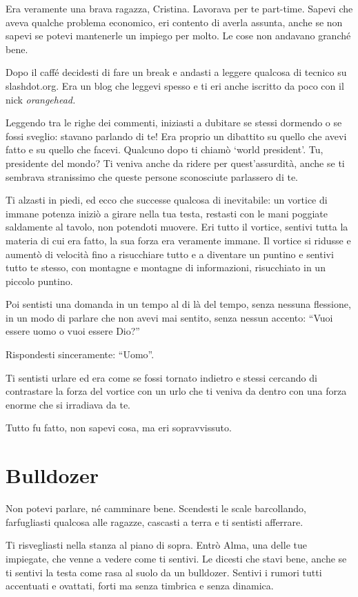 Era veramente una brava ragazza, Cristina. Lavorava per te part-time. Sapevi che aveva qualche problema economico, eri contento di averla assunta, anche se non sapevi se potevi mantenerle un impiego per molto. Le cose non andavano granché bene.

Dopo il caffé decidesti di fare un break e andasti a leggere qualcosa di tecnico su slashdot.org. Era un blog che leggevi spesso e ti eri anche iscritto da poco con il nick \textit{orangehead.}

Leggendo tra le righe dei commenti, iniziasti a dubitare se stessi dormendo o se fossi sveglio: stavano parlando di te! Era proprio un dibattito su quello che avevi fatto e su quello che facevi. Qualcuno dopo ti chiamò `world president'. Tu, presidente del mondo? Ti veniva anche da ridere per quest'assurdità, anche se ti sembrava stranissimo che queste persone sconosciute parlassero di te.

Ti alzasti in piedi, ed ecco che successe qualcosa di inevitabile: un vortice di immane potenza iniziò a girare nella tua testa, restasti con le mani poggiate saldamente al tavolo, non potendoti muovere. Eri tutto il vortice, sentivi tutta la materia di cui era fatto, la sua forza era veramente immane. Il vortice si ridusse e aumentò di velocità fino a risucchiare tutto e a diventare un puntino e sentivi tutto te stesso, con montagne e montagne di informazioni, risucchiato in un piccolo puntino.

Poi sentisti una domanda in un tempo al di là del tempo, senza nessuna flessione, in un modo di parlare che non avevi mai sentito, senza nessun accento: “Vuoi essere uomo o vuoi essere Dio?”

Rispondesti sinceramente: “Uomo”.

Ti sentisti urlare ed era come se fossi tornato indietro e stessi cercando di contrastare la forza del vortice con un urlo che ti veniva da dentro con una forza enorme che si irradiava da te.

Tutto fu fatto, non sapevi cosa, ma eri sopravvissuto.

\section{Bulldozer}
\label{bulldozer} 

Non potevi parlare, né camminare bene. Scendesti le scale barcollando, farfugliasti qualcosa alle ragazze, cascasti a terra e ti sentisti afferrare.

Ti risvegliasti nella stanza al piano di sopra. Entrò Alma, una delle tue impiegate, che venne a vedere come ti sentivi. Le dicesti che stavi bene, anche se ti sentivi la testa come rasa al suolo da un bulldozer. Sentivi i rumori tutti accentuati e ovattati, forti ma senza timbrica e senza dinamica.

